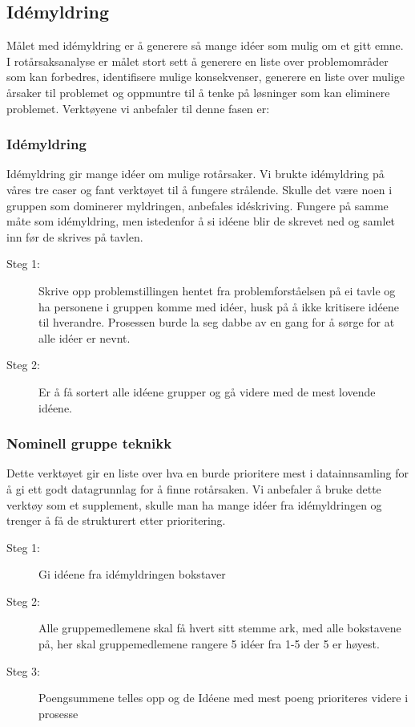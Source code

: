 \subsection{Idémyldring}
Målet med idémyldring er å generere så mange idéer som mulig om et gitt emne. I rotårsaksanalyse er målet stort sett å generere en liste over problemområder som kan forbedres, identifisere mulige konsekvenser, generere en liste over mulige årsaker til problemet og oppmuntre til å tenke på løsninger som kan eliminere problemet. Verktøyene vi anbefaler til denne fasen er:

\subsubsection{Idémyldring} Idémyldring gir mange idéer om mulige rotårsaker. Vi brukte idémyldring på våres tre caser og fant verktøyet til å fungere strålende. Skulle det være noen i gruppen som dominerer myldringen, anbefales idéskriving. Fungere på samme måte som idémyldring, men istedenfor å si idéene blir de skrevet ned og samlet inn før de skrives på tavlen.

\begin{description}
    \item[Steg 1:] Skrive opp problemstillingen hentet fra problemforståelsen på ei tavle og ha personene i gruppen komme med idéer, husk på å ikke kritisere idéene til hverandre. Prosessen burde la seg dabbe av en gang for å sørge for at alle idéer er nevnt. 
    \item[Steg 2:] Er å få sortert alle idéene grupper og gå videre med de mest lovende idéene.
\end{description}

\subsubsection{Nominell gruppe teknikk} Dette verktøyet gir en liste over hva en burde prioritere mest i datainnsamling for å gi ett godt datagrunnlag for å finne rotårsaken. Vi anbefaler å bruke dette verktøy som et supplement, skulle man ha mange idéer fra idémyldringen og trenger å få de strukturert etter prioritering.
\begin{description}
    \item[Steg 1:] Gi idéene fra idémyldringen bokstaver
    \item[Steg 2:] Alle gruppemedlemene skal få hvert sitt stemme ark, med alle bokstavene på, her skal gruppemedlemene rangere 5 idéer fra 1-5 der 5 er høyest.
    \item[Steg 3:] Poengsummene telles opp og de Idéene med mest poeng prioriteres videre i prosesse
\end{description}


